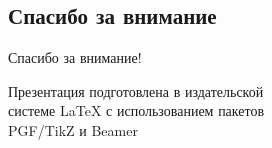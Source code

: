 \documentclass[10pt,pdf,hyperref={unicode}, dvipsnames]{beamer}
\begin{document}
\subsection{Спасибо за внимание}
\begin{frame}[plain]
	\vspace{4cm}
	\begin{center}
		\Huge
		Спасибо за внимание!
	\end{center}
	\vspace{2.5cm}
	\begin{center}
		\color{black!30!white}
		Презентация подготовлена в издательской \\
		системе LaTeX с использованием пакетов \\
		PGF/TikZ и Beamer
	\end{center}
\end{frame}
\end{document}
